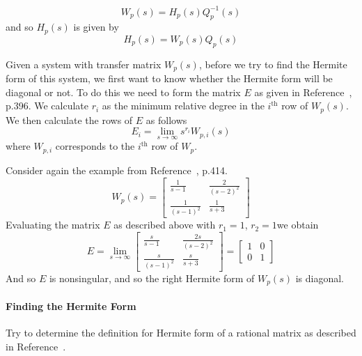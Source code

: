\begin{equation*}
  W_{p}(s)=H_{p}(s)Q_{p}^{-1}(s)
\end{equation*}
and so $H_{p}(s)$ is given by
\begin{equation*}
  H_{p}(s)=W_{p}(s)Q_{p}(s)
\end{equation*}

Given a system with transfer matrix $W_{p}(s)$, before we try to find the Hermite form of this system, we first want to know whether the Hermite form will be diagonal or not.
To do this we need to form the matrix $E$ as given in Reference~\cite{narendra.stable.2005}, p.396.
We calculate $r_{i}$ as the minimum relative degree in the $i^{\text{th}}$ row of $W_{p}(s)$.
We then calculate the rows of $E$ as follows
\begin{equation}\label{eqn.adaptive.E}
  E_{i}=\lim_{s\rightarrow\infty}s^{r_{i}}W_{p,i}(s)
\end{equation}
where $W_{p,i}$ corresponds to the $i^{\text{th}}$ row of $W_{p}$.

\begin{example}\label{example.hermite_structure}
  Consider again the example from Reference~\cite{narendra.stable.2005}, p.414.
  \begin{equation*}
    W_{p}(s)=
    \begin{bmatrix}
      \frac{1}{s-1}& \frac{2}{(s-2)^{2}} \\
      \frac{1}{(s-1)^{2}} & \frac{1}{s+3}
    \end{bmatrix}
  \end{equation*}
  Evaluating the matrix $E$ as described above with $r_{1}=1$, $r_{2}=1$we obtain
  \begin{equation*}
    E=
    \lim_{s\rightarrow\infty}
    \begin{bmatrix}
      \frac{s}{s-1}& \frac{2s}{(s-2)^{2}} \\
      \frac{s}{(s-1)^{2}} & \frac{s}{s+3}
    \end{bmatrix}
    =
    \begin{bmatrix}
      1 & 0 \\
      0 & 1
    \end{bmatrix}
  \end{equation*}
  And so $E$ is nonsingular, and so the right Hermite form of $W_{p}(s)$ is diagonal.
\end{example}

\paragraph{Finding the Hermite Form}
Try to determine the definition for Hermite form of a rational matrix as described in Reference~\cite{narendra.stable.2005}.

